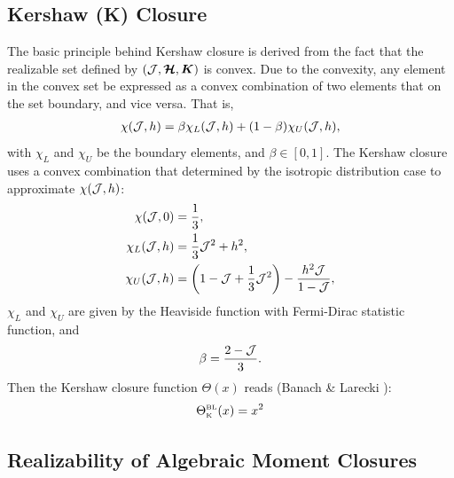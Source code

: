 \subsection{Kershaw (K) Closure}

The basic principle behind Kershaw closure is derived from the fact that the realizable set defined by $(\mathcal{J}, \boldsymbol{\mathcal{H}}, \boldsymbol{K})$ is convex.
Due to the convexity, any element in the convex set be expressed as a convex combination of two elements that on the set boundary, and vice versa.
That is,
\begin{align}
 \chi(\mathcal{J},h) = \beta  \chi_{L}(\mathcal{J},h) + (1-\beta) \chi_{U}(\mathcal{J},h),
\end{align}
with $\chi_{L}$ and $\chi_{U}$ be the boundary elements, and $\beta \in [0,1]$. 
The Kershaw closure uses a convex combination that determined by the isotropic distribution case to approximate $\chi(\mathcal{J},h)$:
\begin{align}
 \chi(\mathcal{J},0)  &= \dfrac{1}{3},\\
\chi_{L}(\mathcal{J},h) & = \dfrac{1}{3}\mathcal{J}^2 + h^2, \\
\chi_{U}(\mathcal{J},h) & = \left( 1 - \mathcal{J} + \dfrac{1}{3}\mathcal{J}^2 \right) - \dfrac{h^2 \mathcal{J}}{1-\mathcal{J}},
\end{align}
$\chi_{L}$ and $\chi_{U}$ are given by the Heaviside function with Fermi-Dirac statistic function, and
\begin{align}
\beta = \dfrac{2 - \mathcal{J}}{3}.
\end{align}
Then the Kershaw closure function $\Theta(x)$ reads (Banach \& Larecki \cite{banachLarecki_2017a}):
\begin{equation}
  \Theta_{\mbox{\tiny K}}^{\mbox{\tiny BL}}(x)=x^{2}
\end{equation}

\subsection{Realizability of Algebraic Moment Closures}

